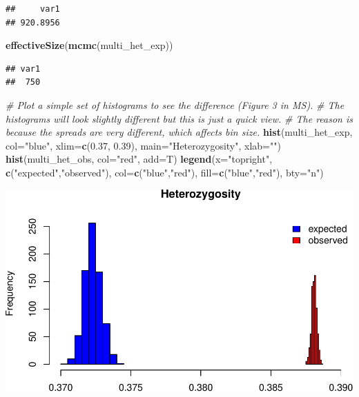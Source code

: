 \documentclass[]{article}
\newenvironment{Shaded}{\begin{snugshade}}{\end{snugshade}}
\newcommand{\KeywordTok}[1]{\textcolor[rgb]{0.13,0.29,0.53}{\textbf{{#1}}}}
\newcommand{\DataTypeTok}[1]{\textcolor[rgb]{0.13,0.29,0.53}{{#1}}}
\newcommand{\FloatTok}[1]{\textcolor[rgb]{0.00,0.00,0.81}{{#1}}}
\newcommand{\StringTok}[1]{\textcolor[rgb]{0.31,0.60,0.02}{{#1}}}
\newcommand{\CommentTok}[1]{\textcolor[rgb]{0.56,0.35,0.01}{\textit{{#1}}}}
\newcommand{\NormalTok}[1]{{#1}}
\begin{document}
\begin{verbatim}
##     var1 
## 920.8956
\end{verbatim}

\begin{Shaded}
\begin{Highlighting}[]
\KeywordTok{effectiveSize}\NormalTok{(}\KeywordTok{mcmc}\NormalTok{(multi_het_exp))}
\end{Highlighting}
\end{Shaded}

\begin{verbatim}
## var1 
##  750
\end{verbatim}

\begin{Shaded}
\begin{Highlighting}[]
\CommentTok{# Plot a simple set of histograms to see the difference (Figure 3 in MS).}
\CommentTok{# The histograms will look slightly different but this is just a quick view.}
\CommentTok{# The reason is because the spreads are very different, which affects bin size.}
\KeywordTok{hist}\NormalTok{(multi_het_exp, }\DataTypeTok{col=}\StringTok{"blue"}\NormalTok{, }\DataTypeTok{xlim=}\KeywordTok{c}\NormalTok{(}\FloatTok{0.37}\NormalTok{, }\FloatTok{0.39}\NormalTok{), }
     \DataTypeTok{main=}\StringTok{"Heterozygosity"}\NormalTok{, }\DataTypeTok{xlab=}\StringTok{""}\NormalTok{)}
\KeywordTok{hist}\NormalTok{(multi_het_obs, }\DataTypeTok{col=}\StringTok{"red"}\NormalTok{, }\DataTypeTok{add=}\NormalTok{T)}
\KeywordTok{legend}\NormalTok{(}\DataTypeTok{x=}\StringTok{"topright"}\NormalTok{, }
       \KeywordTok{c}\NormalTok{(}\StringTok{"expected"}\NormalTok{,}\StringTok{"observed"}\NormalTok{), }
       \DataTypeTok{col=}\KeywordTok{c}\NormalTok{(}\StringTok{"blue"}\NormalTok{,}\StringTok{"red"}\NormalTok{), }
       \DataTypeTok{fill=}\KeywordTok{c}\NormalTok{(}\StringTok{"blue"}\NormalTok{,}\StringTok{"red"}\NormalTok{), }\DataTypeTok{bty=}\StringTok{"n"}\NormalTok{)}
\end{Highlighting}
\end{Shaded}

\includegraphics{supplement_files/figure-latex/unnamed-chunk-4-1.pdf}
\end{document}
